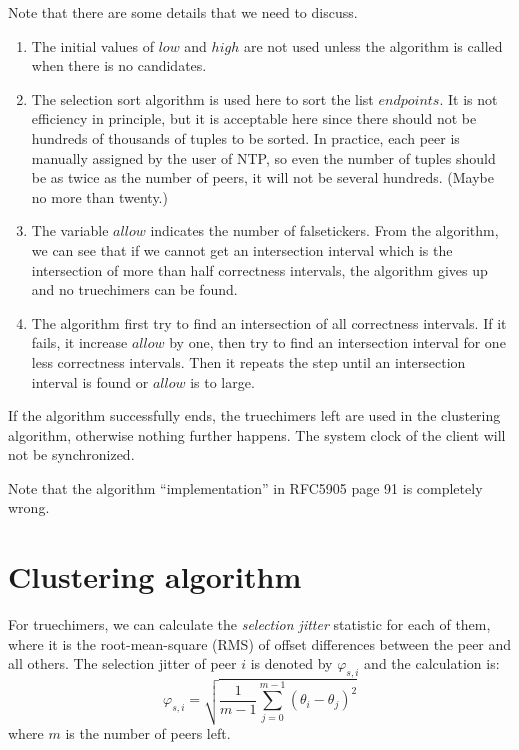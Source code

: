 Note that there are some details that we need to discuss. 
\begin{enumerate}
    \item 
        The initial values of $low$ and $high$ are not used unless the
        algorithm is called when there is no candidates.
    \item 
        The selection sort algorithm is used here to sort the list
        $endpoints$. It is not efficiency in principle, but it is acceptable
        here since there should not be hundreds of thousands of tuples to be
        sorted. In practice, each peer is manually assigned by the user of
        NTP, so even the number of tuples should be as twice as the number of
        peers, it will not be several hundreds. (Maybe no more than twenty.)
    \item
        The variable $allow$ indicates the number of falsetickers. From the
        algorithm, we can see that if we cannot get an intersection interval
        which is the intersection of more than half correctness intervals,
        the algorithm gives up and no truechimers can be
        found.~\cite{clock_selection}
    \item
        The algorithm first try to find an intersection of all correctness
        intervals. If it fails, it increase $allow$ by one, then try to find
        an intersection interval for one less correctness intervals. Then it
        repeats the step until an intersection interval is found or $allow$
        is to large.
\end{enumerate}
If the algorithm successfully ends, the truechimers left are used in the
clustering algorithm, otherwise nothing further happens.  The system clock of
the client will not be synchronized.

Note that the algorithm ``implementation'' in RFC5905 page 91 is completely
wrong.


\section{Clustering algorithm}%
\label{sec:clustering_algorithm}
For truechimers, we can  calculate the \emph{selection jitter} statistic for
each of them, where it is the root-mean-square (RMS) of offset differences
between the peer and all others. The selection jitter of peer $i$ is denoted by
$\varphi_{s,i}$ and the calculation is:
\begin{equation}
    \varphi_{s,i} = \sqrt{\frac{1}{m-1} \sum^{m-1}_{j=0} (\theta_i -
    \theta_j)^2 }
    \label{eq:selection_jitter}
\end{equation}
where $m$ is the number of peers left.

